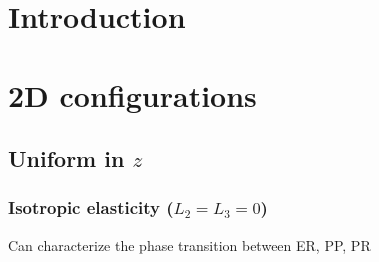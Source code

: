 \documentclass[reqno]{article}
\begin{document}
\section{Introduction}

\section{2D configurations}

\subsection{Uniform in $z$}

\subsubsection{Isotropic elasticity ($L_2 = L_3 = 0$)}

Can characterize the phase transition between ER, PP, PR 
\end{document}
